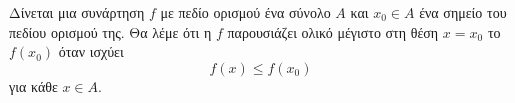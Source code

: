 Δίνεται μια συνάρτηση $ f $ με πεδίο ορισμού ένα σύνολο $  A $ και $ x_0\in A $ ένα σημείο του πεδίου ορισμού της. Θα λέμε ότι η $ f $ παρουσιάζει ολικό μέγιστο στη θέση $ x=x_0 $ το $ f(x_0) $ όταν ισχύει
\[ f(x)\leq f(x_0) \]
για κάθε $ x\in A $.
